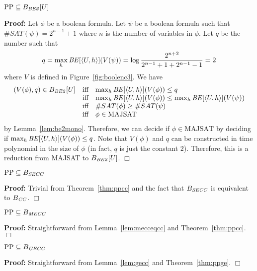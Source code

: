 \documentclass{llncs}
\newenvironment{proof}{\noindent\rm{\bf Proof:}}{\hbox{$\Box$}\vspace*{0.2\baselineskip}}
\newenvironment{reftheorem}[1]{\begin{trivlist}\item[\hskip
      \labelsep{\bf Theorem #1.}]\it}{\end{trivlist}}
\newcommand{\aseq}[1]{\langle#1\rangle}
\begin{document}
\begin{reftheorem}{\ref{thm:ppbe2}}
$\text{PP}\subseteq B_{\it BE2}[U]$
\end{reftheorem}
\begin{proof}
Let $\phi$ be a boolean formula.  Let $\psi$ be a boolean formula such that $\#SAT(\psi)=2^{n-1}+1$ where $n$ is the number of variables in $\phi$.  Let $q$ be the number such that
\[
q=\max_h {\it BE}[\aseq{U,h}](V(\psi))=\log\frac{2^{n+2}}{2^{n-1}+1 + 2^{n-1}-1}=2
\]
where $V$ is defined in Figure~\ref{fig:boolenc3}.  We have
\[
\begin{array}{rcl}
(V(\phi),q)\in B_{\it BE2}[U]& \textrm{iff}&
\max_h {\it BE}[\aseq{U,h}](V(\phi))\leq q\\
& \textrm{iff}& \max_h {\it BE}[\aseq{U,h}](V(\phi))\leq \max_h {\it BE}[\aseq{U,h}](V(\psi))\\
  &\textrm{iff}& \#SAT(\phi)\ge\#SAT(\psi)\\
  &\textrm{iff}& \phi\in\textrm{MAJSAT}
\end{array}
\]
by Lemma~\ref{lem:be2mono}.  Therefore, we can decide if
$\phi\in\textrm{MAJSAT}$ by deciding if $\max_h {\it
  BE}[\aseq{U,h}](V(\phi))\le q$.  Note that $V(\phi)$ and $q$ can be
constructed in time polynomial in the size of $\phi$ (in fact, $q$ is
just the constant $2$).  Therefore, this is a reduction from
\textrm{MAJSAT} to $B_{\it BE2}[U]$.
\end{proof}

\begin{reftheorem}{\ref{thm:ppsecc}}
  $\text{PP}\subseteq B_{\it SECC}$
\end{reftheorem}
\begin{proof}
  Trivial from Theorem~\ref{thm:ppcc} and the fact that $B_{\it SECC}$
  is equivalent to $B_{\it CC}$.
\end{proof}

\begin{reftheorem}{\ref{thm:ppmecc}}
  $\text{PP}\subseteq B_{\it MECC}$
\end{reftheorem}
\begin{proof}
Straightforward from Lemma~\ref{lem:mecceqcc} and Theorem~\ref{thm:ppcc}.
\end{proof}

\begin{reftheorem}{\ref{thm:ppgecc}}
  $\text{PP}\subseteq B_{\it GECC}$
\end{reftheorem}
\begin{proof}
Straightforward from Lemma~\ref{lem:gecc} and Theorem~\ref{thm:ppge}.
\end{proof}
\end{document}
